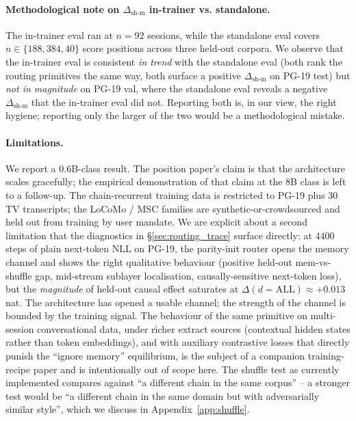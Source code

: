 \documentclass{article}
\newcommand{\dsh}{\Delta_{\text{sh-m}}}
\begin{document}
\paragraph{Methodological note on $\dsh$ in-trainer vs. standalone.}
The in-trainer eval ran at $n = 92$ sessions, while the standalone
eval covers $n \in \{188, 384, 40\}$ score positions across three
held-out corpora. We observe that the in-trainer eval is consistent
\emph{in trend} with the standalone eval (both rank the routing
primitives the same way, both surface a positive $\dsh$ on PG-19
test) but \emph{not in magnitude} on PG-19 val, where the
standalone eval reveals a negative $\dsh$ that the in-trainer eval
did not. Reporting both is, in our view, the right hygiene; reporting
only the larger of the two would be a methodological mistake.

\paragraph{Limitations.}
\label{sec:limits}
We report a 0.6B-class result. The position paper's claim is that
the architecture scales gracefully; the empirical demonstration of
that claim at the 8B class is left to a follow-up. The chain-recurrent
training data is restricted to PG-19 plus 30 TV transcripts; the
LoCoMo / MSC families are synthetic-or-crowdsourced and held out
from training by user mandate. We are explicit about a second
limitation that the diagnostics in \S\ref{sec:routing_trace} surface
directly: at $4400$ steps of plain next-token NLL on PG-19, the
parity-init router opens the memory channel and shows the right
qualitative behaviour (positive held-out mem-vs-shuffle gap, mid-stream
sublayer localisation, causally-sensitive next-token loss), but the
\emph{magnitude} of held-out causal effect saturates at
$\Delta(d{=}\mathrm{ALL}) \approx +0.013$ nat. The architecture has
opened a usable channel; the strength of the channel is bounded by the
training signal. The behaviour of the same primitive on multi-session
conversational data, under richer extract sources (contextual hidden
states rather than token embeddings), and with auxiliary contrastive
losses that directly punish the ``ignore memory'' equilibrium, is the
subject of a companion training-recipe paper and is intentionally out
of scope here. The shuffle test as currently implemented compares
against ``a different chain in the same corpus'' -- a stronger test
would be ``a different chain in the same domain but with adversarially
similar style'', which we discuss in Appendix~\ref{app:shuffle}.
\end{document}

